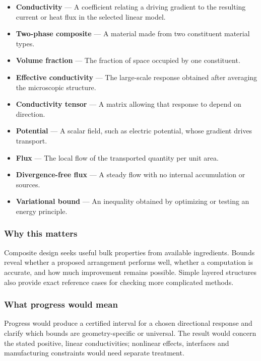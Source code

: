 \documentclass[
  11pt,
]{article}
\begin{document}
\begin{itemize}
\item
  \textbf{Conductivity} --- A coefficient relating a driving gradient to
  the resulting current or heat flux in the selected linear model.
\item
  \textbf{Two-phase composite} --- A material made from two constituent
  material types.
\item
  \textbf{Volume fraction} --- The fraction of space occupied by one
  constituent.
\item
  \textbf{Effective conductivity} --- The large-scale response obtained
  after averaging the microscopic structure.
\item
  \textbf{Conductivity tensor} --- A matrix allowing that response to
  depend on direction.
\item
  \textbf{Potential} --- A scalar field, such as electric potential,
  whose gradient drives transport.
\item
  \textbf{Flux} --- The local flow of the transported quantity per unit
  area.
\item
  \textbf{Divergence-free flux} --- A steady flow with no internal
  accumulation or sources.
\item
  \textbf{Variational bound} --- An inequality obtained by optimizing or
  testing an energy principle.
\end{itemize}

\subsubsection{Why this matters}

Composite design seeks useful bulk properties from available
ingredients. Bounds reveal whether a proposed arrangement performs well,
whether a computation is accurate, and how much improvement remains
possible. Simple layered structures also provide exact reference cases
for checking more complicated methods.

\subsubsection{What progress would mean}

Progress would produce a certified interval for a chosen directional
response and clarify which bounds are geometry-specific or universal.
The result would concern the stated positive, linear conductivities;
nonlinear effects, interfaces and manufacturing constraints would need
separate treatment.
\end{document}
